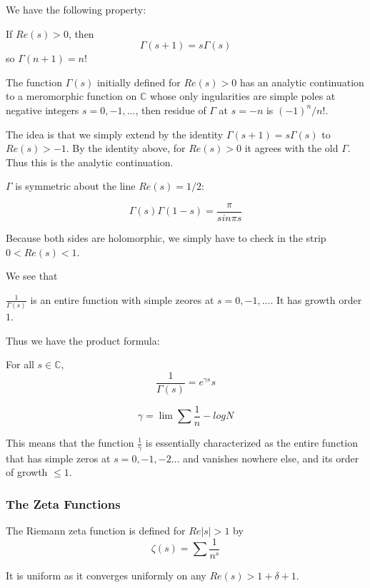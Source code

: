 \documentclass[main.tex]{subfiles}
\begin{document}
We have the following property:
\begin{lemma}
If $Re(s) > 0$, then 
$$
\Gamma(s+ 1) = s \Gamma(s)
$$
so $\Gamma(n+1) = n!$
\end{lemma}

\begin{theorem}
The function $\Gamma(s)$ initially defined for $Re(s) > 0$ has an analytic continuation to a meromorphic function on $\mathbb{C}$ whose only ingularities are simple poles at negative integers $s = 0, -1, ... $, then residue of $\Gamma$ at $s = -n$ is $(-1)^n /n!$.
\end{theorem}
The idea is that we simply extend by the identity $\Gamma(s+ 1) = s \Gamma(s)$ to $Re(s) > -1$. By the identity above, for $Re(s) > 0$ it agrees with the old $\Gamma$. Thus this is the analytic continuation.

$\Gamma$ is symmetric about the line $Re(s) = 1/2$:

\begin{theorem}
$$
\Gamma(s) \Gamma(1-s) = \frac{\pi}{sin \pi s}
$$
\end{theorem}
Because both sides are holomorphic, we simply have to check in the strip $0 < Re(s) < 1$.

We see that 
\begin{theorem}
$\frac{1}{\Gamma(s)}$ is an entire function with simple zeores at $s = 0, -1, ...$. It has growth order $1$.
\end{theorem}

Thus we have the product formula:

\begin{theorem}
For all $s \in \mathbb{C}$, 
$$
\frac{1}{\Gamma(s)} = e^{\gamma s} s 
$$
\end{theorem}

$$\gamma = \lim \sum \frac{1}{n} - log N$$

This means that the function $\frac{1}{\gamma}$ is essentially characterized as the entire function that has simple zeros at $s = 0, -1, -2...$ and vanishes nowhere else, and its order of growth $\leq 1$.


\subsubsection{The Zeta Functions}

The Riemann zeta function is defined for $Re|s| > 1$ by 
$$
\zeta(s) = \sum \frac{1}{n^s}
$$

It is uniform as it converges uniformly on any $Re(s) > 1 + \delta + 1$.
\end{document}
